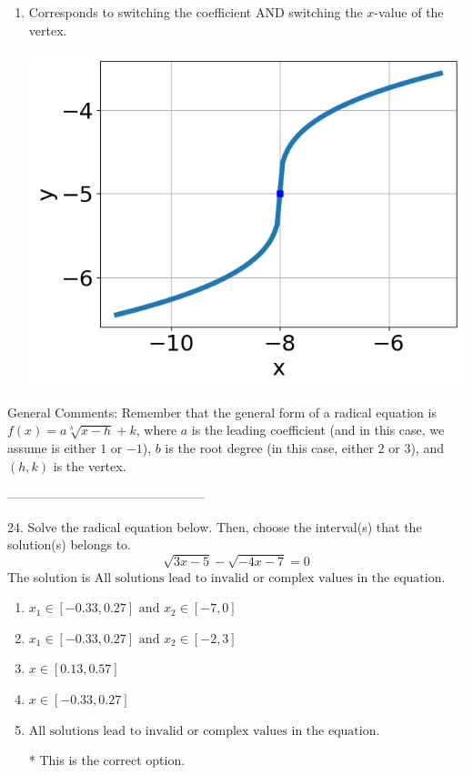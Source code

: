 \documentclass{article}[10pt]
\begin{document}
\begin{enumerate}[label=\Alph*.]
\item Corresponds to switching the coefficient AND switching the $x$-value of the vertex. 
\begin{center}\includegraphics[scale=0.5]{../Figures/question23CB.png}\end{center} 
 
\end{enumerate} 
 
General Comments: Remember that the general form of a radical equation is $ f(x) = a \sqrt[b]{x - h} + k$, where $a$ is the leading coefficient (and in this case, we assume is either $1$ or $-1$), $b$ is the root degree (in this case, either $2$ or $3$), and $(h, k)$ is the vertex.

-----------------------------------------------

24. Solve the radical equation below. Then, choose the interval(s) that the solution(s) belongs to.
$$ \sqrt{3 x - 5} - \sqrt{-4 x - 7} = 0 $$ 
The solution is $ \text{All solutions lead to invalid or complex values in the equation.} $ 

\begin{enumerate}[label=\Alph*.] 
\item $ x_1 \in [-0.33, 0.27] \text{ and } x_2 \in [-7,0] $ 

  
\item $ x_1 \in [-0.33, 0.27] \text{ and } x_2 \in [-2,3] $ 

  
\item $ x \in [0.13,0.57] $ 

  
\item $ x \in [-0.33,0.27] $ 

  
\item $ \text{All solutions lead to invalid or complex values in the equation.} $ 

 * This is the correct option. 
\end{enumerate} 
 
\end{document}
